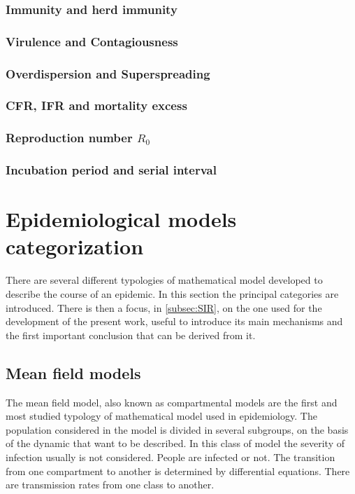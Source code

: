 \subsubsection{Immunity and herd immunity}

\subsubsection{Virulence and Contagiousness}

\subsubsection{Overdispersion and Superspreading}

\subsubsection{CFR, IFR and mortality excess}

\subsubsection{Reproduction number $R_0$}

\subsubsection{Incubation period and serial interval}

\section{Epidemiological models categorization }
There are several different typologies of mathematical model developed to describe the course of an epidemic. In this section the principal categories are introduced. There is then a focus, in \ref{subsec:SIR}, on the one used for the development of the present work, useful to introduce its main mechanisms and the first important conclusion that can be derived from it. 



 
\subsection{Mean field models}

The mean field model, also known as compartmental models are the first and most studied typology of mathematical model used in epidemiology.  The population considered in the model is divided in several subgroups, on the basis of the dynamic that want to be described. In this class of model  the severity of infection usually is not considered. People are infected or not. The transition from one compartment to another is determined by differential equations. There are transmission rates from one class to another. 

